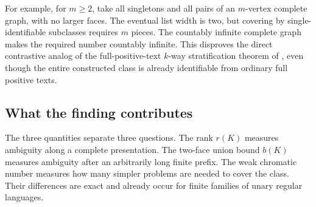 For example, for $m\ge2$, take all singletons and all pairs of an $m$-vertex complete graph, with no larger faces. The eventual list width is two, but covering by single-identifiable subclasses requires $m$ pieces. The countably infinite complete graph makes the required number countably infinite. This disproves the direct contrastive analog of the full-positive-text $k$-way stratification theorem of \citet{P14}, even though the entire constructed class is already identifiable from ordinary full positive texts.


\subsection{What the finding contributes}
The three quantities separate three questions. The rank $r(K)$ measures ambiguity along a complete presentation. The two-face union bound $b(K)$ measures ambiguity after an arbitrarily long finite prefix. The weak chromatic number measures how many simpler problems are needed to cover the class. Their differences are exact and already occur for finite families of unary regular languages.

